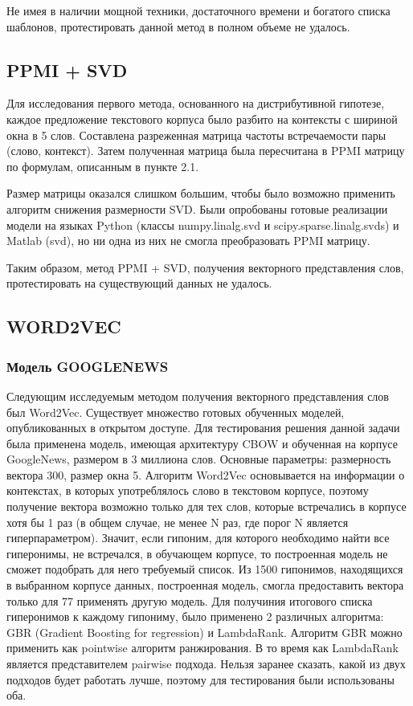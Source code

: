 Не имея в наличии мощной техники, достаточного времени и богатого списка
шаблонов, протестировать данной метод в полном объеме не удалось.





\subsection{PPMI + SVD}

Для исследования первого метода, основанного на дистрибутивной гипотезе, каждое
предложение текстового корпуса было разбито на контексты с шириной окна в 5 слов.
Составлена разреженная матрица частоты встречаемости пары (слово, контекст). Затем
полученная матрица была пересчитана в PPMI матрицу по формулам, описанным в пункте
2.1.

Размер матрицы оказался слишком большим, чтобы было возможно применить алгоритм
снижения размерности SVD. Были опробованы готовые реализации модели на языках
Python (классы numpy.linalg.svd и scipy.sparse.linalg.svds) и Matlab (svd), но ни одна из них не смогла преобразовать PPMI матрицу.

Таким образом, метод PPMI + SVD, получения векторного представления слов,
протестировать на существующий данных не удалось.





\subsection{WORD2VEC}

\subsubsection{Модель GOOGLENEWS}

Следующим исследуемым методом получения векторного представления слов был
Word2Vec.
Существует множество готовых обученных моделей, опубликованных в открытом доступе.
Для тестирования решения данной задачи была применена модель, имеющая архитектуру
CBOW и обученная на корпусе GoogleNews, размером в 3 миллиона слов. Основные
параметры: размерность вектора 300, размер окна 5.
Алгоритм Word2Vec основывается на информации о контекстах, в которых употреблялось
слово в текстовом корпусе, поэтому получение вектора возможно только для тех слов,
которые встречались в корпусе хотя бы 1 раз (в общем случае, не менее N раз, где порог N
является гиперпараметром). Значит, если гипоним, для которого необходимо найти все
гиперонимы, не встречался, в обучающем корпусе, то построенная модель не сможет
подобрать для него требуемый список.
Из 1500 гипонимов, находящихся в выбранном корпусе данных, построенная модель,
смогла предоставить вектора только для 77%
применять другую модель.
Для получиния итогового списка гиперонимов к каждому гипониму, было применено 2
различных алгоритма: GBR (Gradient Boosting for regression) и LambdaRank.
Алгоритм GBR можно применить как pointwise алгоритм ранжирования. В то время как
LambdaRank является представителем pairwise подхода. Нельзя заранее сказать, какой из
двух подходов будет работать лучше, поэтому для тестирования были использованы оба.


